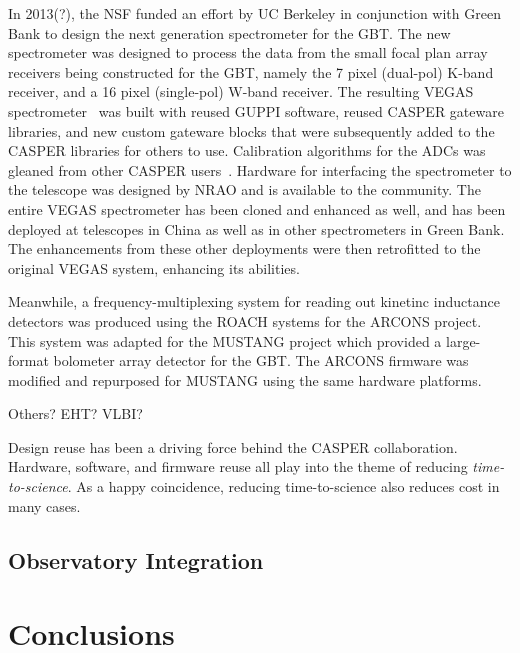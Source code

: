 \documentclass{ws-jai}
\begin{document}
In 2013(?), the NSF funded an effort by UC Berkeley in conjunction
with Green Bank to design the next generation spectrometer for the
GBT.  The new spectrometer was designed to process the data from the
small focal plan array receivers being constructed for the GBT, namely
the 7 pixel (dual-pol) K-band receiver, and a 16 pixel (single-pol)
W-band receiver.  The resulting VEGAS
spectrometer~\cite{chennamengalam} was built with reused GUPPI
software, reused CASPER gateware libraries, and new custom gateware
blocks that were subsequently added to the CASPER libraries for others
to use.  Calibration algorithms for the ADCs was gleaned from other
CASPER users~\cite{Jack and Rurik}.  Hardware for interfacing the
spectrometer to the telescope was designed by NRAO and is available to
the community.  The entire VEGAS spectrometer has been cloned and
enhanced as well, and has been deployed at telescopes in China as well
as in other spectrometers in Green Bank.  The enhancements from these
other deployments were then retrofitted to the original VEGAS system,
enhancing its abilities.

Meanwhile, a frequency-multiplexing system for reading out kinetinc
inductance detectors was produced using the ROACH systems for the
ARCONS project.  This system was adapted for the MUSTANG project which
provided a large-format bolometer array detector for the GBT.  The
ARCONS firmware was modified and repurposed for MUSTANG using the same
hardware platforms. 

Others?  EHT? VLBI?

Design reuse has been a driving force behind the CASPER collaboration.
Hardware, software, and firmware reuse all play into the theme of
reducing \emph{time-to-science}.  As a happy coincidence, reducing
time-to-science also reduces cost in many cases.


\subsection{Observatory Integration}


\section{Conclusions} \label{sec:Conclusions}





\end{document}
